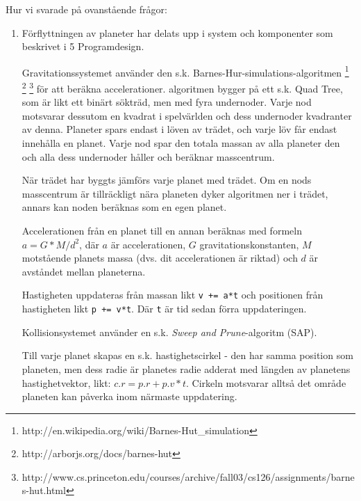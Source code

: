 
Hur vi svarade på ovanstående frågor:
\begin{enumerate}
    \item Förflyttningen av planeter har delats upp i system och komponenter
        som beskrivet i 5 Programdesign.

        \vspace{6pt}

        Gravitationssystemet använder den s.k.
        Barnes-Hur-simulations-algoritmen
        \footnote{http://en.wikipedia.org/wiki/Barnes-Hut_simulation}
        \footnote{http://arborjs.org/docs/barnes-hut}
        \footnote{http://www.cs.princeton.edu/courses/archive/fall03/cs126/assignments/barnes-hut.html}
        för att beräkna accelerationer.
        algoritmen bygger på ett s.k. Quad Tree, som är likt ett
        binärt sökträd, men med fyra undernoder.
        Varje nod motsvarar dessutom en kvadrat i spelvärlden och
        dess undernoder kvadranter av denna.
        Planeter spars endast i löven av trädet, och varje löv
        får endast innehålla en planet.
        Varje nod spar den totala massan av alla planeter den och
        alla dess undernoder håller och beräknar masscentrum.

        När trädet har byggts jämförs varje planet med trädet.
        Om en nods masscentrum är tillräckligt nära planeten
        dyker algoritmen ner i trädet, annars kan noden beräknas
        som en egen planet.

        Accelerationen från en planet till en annan beräknas med
        formeln $a = G*M/d^2$, där $a$ är accelerationen, $G$
        gravitationskonstanten, $M$ motstående planets massa (dvs.
        dit accelerationen är riktad) och $d$ är avståndet mellan
        planeterna.

        Hastigheten uppdateras från massan likt \verb#v += a*t#
        och positionen från hastigheten likt \verb#p += v*t#.
        Där \verb#t# är tid sedan förra uppdateringen.

        \vspace{6pt}

        Kollisionsystemet använder en s.k.
        \textit{Sweep and Prune}-algoritm (SAP).

        Till varje planet skapas en s.k. hastighetscirkel - 
        den har samma position som planeten, men dess radie
        är planetes radie adderat med längden av planetens hastighetvektor,
        likt: $c.r = p.r + p.v * t$.
        Cirkeln motsvarar alltså det område planeten kan påverka
        inom närmaste uppdatering.


\end{enumerate}
